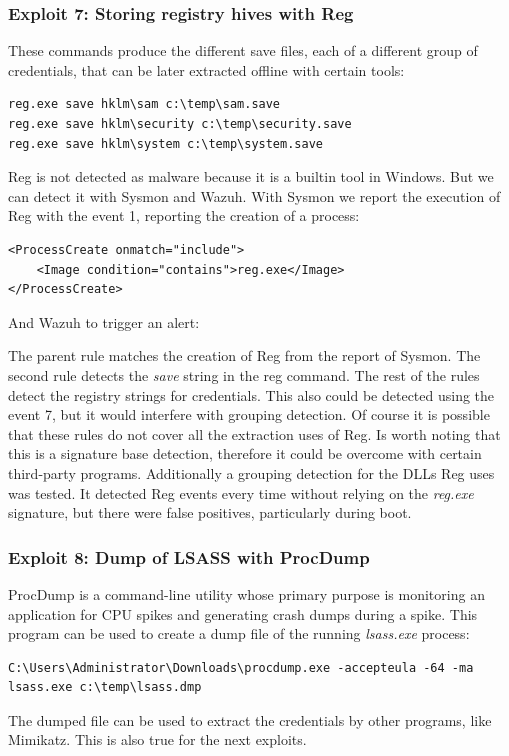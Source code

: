 \subsubsection{Exploit 7: Storing registry hives with Reg}
These commands produce the different save files, each of a different group of credentials, that can be later extracted offline with certain tools\cite{more_dumps}:
\begin{lstlisting}[style=PS]
reg.exe save hklm\sam c:\temp\sam.save
reg.exe save hklm\security c:\temp\security.save
reg.exe save hklm\system c:\temp\system.save
\end{lstlisting}
\linej
Reg is not detected as malware because it is a builtin tool in Windows. But we can detect it with Sysmon and Wazuh. With Sysmon we report the execution of Reg with the event 1, reporting the creation of a process:
\begin{lstlisting}[style=xml]
<ProcessCreate onmatch="include">
	<Image condition="contains">reg.exe</Image>
</ProcessCreate>
\end{lstlisting}
\linej
And Wazuh to trigger an alert:

\linej
The parent rule matches the creation of Reg from the report of Sysmon.
\linej
The second rule detects the \textit{save} string in the reg command.
\linej
The rest of the rules detect the registry strings for credentials.
\linej
\linej
This also could be detected using the event 7, but it would interfere with grouping detection. Of course it is possible that these rules do not cover all the extraction uses of Reg. Is worth noting that this is a signature base detection, therefore it could be overcome with certain third-party programs.
\linej
\linej
Additionally a grouping detection for the DLLs Reg uses was tested. It detected Reg events every time without relying on the \textit{reg.exe} signature, but there were false positives, particularly during boot.

\subsubsection{Exploit 8: Dump of LSASS with ProcDump}
ProcDump\cite{procdump} is a command-line utility whose primary purpose is monitoring an application for CPU spikes and generating crash dumps during a spike. This program can be used to create a dump file of the running \textit{lsass.exe} process:
\begin{lstlisting}[style=PS,numbers=none]
C:\Users\Administrator\Downloads\procdump.exe -accepteula -64 -ma lsass.exe c:\temp\lsass.dmp
\end{lstlisting}
\linej
The dumped file can be used to extract the credentials by other programs, like Mimikatz\cite{more_dumps}. This is also true for the next exploits.

